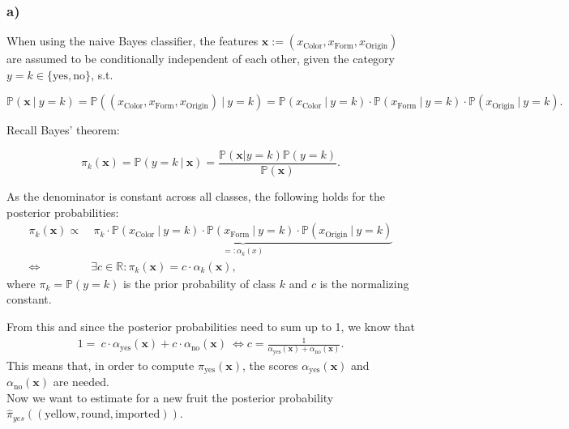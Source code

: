 \documentclass[11pt]{article}
\renewcommand{\P}{\mathds{P}} %
\newcommand{\xv}{\mathbf{x}} %
\newcommand{\pik}[1][k]{\pi_{#1}} %
\newcommand{\postk}[1][k]{\P(y = #1 ~|~ \xv)} %
\newcommand{\pikx}[1][k]{\pi_{#1}(\xv)} %
\newcommand{\bayesrulek}[1][k]{\frac{\P(\xv | y= #1) \P(y= #1)}{\P(\xv)}} %
\begin{document}
    \hypertarget{a}{%
\subsubsection*{a)}\label{a}}


	
	When using the naive Bayes classifier, the features $\xv := 
	(x_\text{Color},x_\text{Form},x_\text{Origin})$ are assumed to be 
	conditionally independent of each other, given the category $y = k \in 
	\{\text{yes}, \text{no}\}$, s.t.
	
	$$ \P(\xv ~|~ y = k) =
	\P((x_\text{Color}, x_\text{Form}, x_\text{Origin}) ~|~ y = k) = 
	\P(x_\text{Color} ~|~ y = k) \cdot \P(x_\text{Form} ~|~ y = k) \cdot 
	\P(x_\text{Origin} ~|~ y = k).$$
	
	Recall Bayes' theorem:
	
	$$\pikx = \postk = \bayesrulek.$$
	
	As the denominator is constant across all classes, the following holds for the 
	posterior probabilities:
	\begin{align*} 
		\pikx \propto & ~ \underbrace{\pik \cdot \P(x_\text{Color} ~|~ y = k)
			\cdot \P(x_\text{Form} ~|~ y = k) \cdot \P(x_\text{Origin} ~|~ y = k)}_{=: 
			\alpha_k(x)} \\
		\iff & \exists c \in \mathbb{R}: \pikx = c \cdot \alpha_k(\xv),
	\end{align*}
	where $\pik = \P(y = k)$ is the prior probability of class $k$ and $c$ is 
	the normalizing constant.
	
	From this and since the posterior probabilities need to sum up to 1, 
	we know that 
	\begin{align*}
		1 = ~ c \cdot \alpha_\text{yes}(\xv) +  c \cdot \alpha_\text{no}(\xv)
		~\iff c = \frac{1}{\alpha_\text{yes}(\xv) + \alpha_\text{no}(\xv)}.
	\end{align*}
	This means that, in order to compute $\pi_\text{yes}(\xv)$, the scores 
	$\alpha_\text{yes}(\xv)$ and $\alpha_\text{no}(\xv)$ are needed.
	\\
	
	Now we want to estimate for a new fruit the posterior probability 
	$\hat{\pi}_{yes}((\text{yellow}, \text{round}, \text{imported}))$.
	
\end{document}
